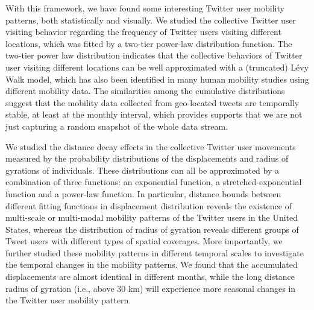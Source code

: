 \documentclass[ijgi,article,submit,moreauthors,pdftex,10pt,a4paper]{mdpi}
\theoremstyle{mdpi}
\newcounter{ex}
\newcounter{re}
\theoremstyle{mdpidefinition}
\begin{document}
With this framework, we have found some interesting Twitter user mobility patterns, both statistically and visually.
We studied the collective Twitter user visiting behavior regarding the frequency of Twitter users visiting different locations, which was fitted by a two-tier power-law distribution function.
The two-tier power law distribution indicates that the collective behaviors of Twitter user visiting different locations can be well approximated with a (truncated) L\'{e}vy Walk model, which has also been identified in many human mobility studies using different mobility data.
The similarities among the cumulative distributions suggest that the mobility data collected from geo-located tweets are temporally stable, at least at the monthly interval, which provides supports that we are not just capturing a random snapshot of the whole data stream. 

We studied the distance decay effects in the collective Twitter user movements measured by the probability distributions of the displacements and radius of gyrations of individuals. 
These distributions can all be approximated by a combination of three functions: an exponential function, a stretched-exponential function and a power-law function. In particular, distance bounds between different fitting functions in displacement distribution reveals the existence of multi-scale or multi-modal mobility patterns of the Twitter users in the United States, whereas the distribution of radius of gyration reveals different groups of Tweet users with different types of spatial coverages.   
More importantly, we further studied these mobility patterns in different temporal scales to investigate the temporal changes in the mobility patterns. 
We found that the accumulated displacements are almost identical in different months, while the long distance radius of gyration (i.e., above 30 km) will experience more seasonal changes in the Twitter user mobility pattern.




\end{document}
